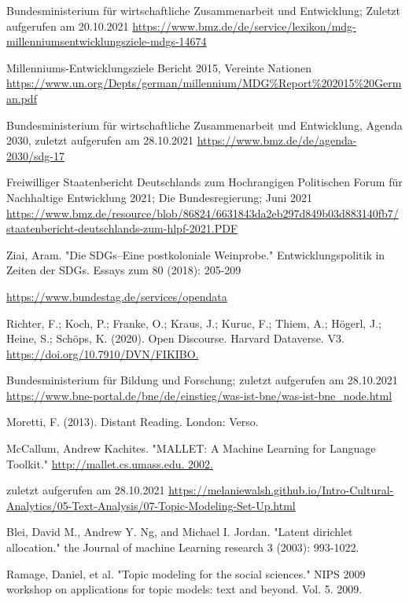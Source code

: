 \documentclass[letterpaper]{article}
\begin{document}
\clearpage

\begin{thebibliography}{xxx}
     Bundesministerium für wirtschaftliche Zusammenarbeit und Entwicklung; Zuletzt aufgerufen am 20.10.2021
        \url{https://www.bmz.de/de/service/lexikon/mdg-millenniumsentwicklungsziele-mdgs-14674}
        
     Millenniums-Entwicklungsziele Bericht 2015, Vereinte Nationen 
        \url{https://www.un.org/Depts/german/millennium/MDG\%Report\%202015\%20German.pdf}
        
     Bundesministerium für wirtschaftliche Zusammenarbeit und Entwicklung, Agenda 2030, zuletzt aufgerufen am 28.10.2021
        \url{https://www.bmz.de/de/agenda-2030/sdg-17}
        
     Freiwilliger Staatenbericht Deutschlands zum Hochrangigen Politischen Forum für Nachhaltige Entwicklung 2021; Die Bundesregierung; Juni 2021
        \url{https://www.bmz.de/resource/blob/86824/6631843da2eb297d849b03d883140fb7/staatenbericht-deutschlands-zum-hlpf-2021.PDF}
        
     Ziai, Aram. "Die SDGs–Eine postkoloniale Weinprobe." Entwicklungspolitik in Zeiten der SDGs. Essays zum 80 (2018): 205-209
    
        \url{https://www.bundestag.de/services/opendata}
        
     Richter, F.; Koch, P.; Franke, O.; Kraus, J.; Kuruc, F.; Thiem, A.; Högerl, J.; Heine, S.; Schöps, K. (2020). Open Discourse.  Harvard Dataverse. V3.
        \url{https://doi.org/10.7910/DVN/FIKIBO.}
        
     Bundesministerium für Bildung und Forschung; zuletzt aufgerufen am 28.10.2021
        \url{https://www.bne-portal.de/bne/de/einstieg/was-ist-bne/was-ist-bne_node.html}
        
     Moretti, F. (2013). Distant Reading. London: Verso. 
    
     McCallum, Andrew Kachites.  "MALLET: A Machine Learning for Language Toolkit."
        \url{http://mallet.cs.umass.edu. 2002.}
    
     zuletzt aufgerufen am 28.10.2021   
        \url{https://melaniewalsh.github.io/Intro-Cultural-Analytics/05-Text-Analysis/07-Topic-Modeling-Set-Up.html}
        
     Blei, David M., Andrew Y. Ng, and Michael I. Jordan. "Latent dirichlet allocation." the Journal of machine Learning research 3 (2003): 993-1022.
    
     Ramage, Daniel, et al. "Topic modeling for the social sciences." NIPS 2009 workshop on applications for topic models: text and beyond. Vol. 5. 2009.


\end{thebibliography}
\end{document}
